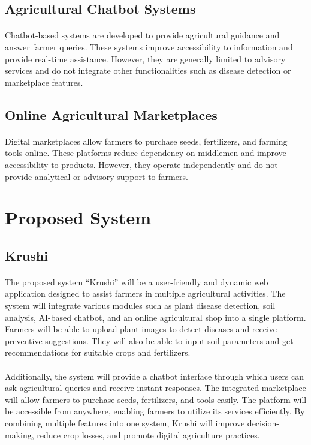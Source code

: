 \subsection{Agricultural Chatbot Systems}
\paragraph{}Chatbot-based systems are developed to provide agricultural guidance and answer farmer queries. These systems improve accessibility to information and provide real-time assistance. However, they are generally limited to advisory services and do not integrate other functionalities such as disease detection or marketplace features.

\subsection{Online Agricultural Marketplaces}
\paragraph{}Digital marketplaces allow farmers to purchase seeds, fertilizers, and farming tools online. These platforms reduce dependency on middlemen and improve accessibility to products. However, they operate independently and do not provide analytical or advisory support to farmers.

\newpage

\section{Proposed System}

\subsection{Krushi}
\paragraph{}The proposed system “Krushi” will be a user-friendly and dynamic web application designed to assist farmers in multiple agricultural activities. The system will integrate various modules such as plant disease detection, soil analysis, AI-based chatbot, and an online agricultural shop into a single platform. Farmers will be able to upload plant images to detect diseases and receive preventive suggestions. They will also be able to input soil parameters and get recommendations for suitable crops and fertilizers.

\paragraph{}Additionally, the system will provide a chatbot interface through which users can ask agricultural queries and receive instant responses. The integrated marketplace will allow farmers to purchase seeds, fertilizers, and tools easily. The platform will be accessible from anywhere, enabling farmers to utilize its services efficiently. By combining multiple features into one system, Krushi will improve decision-making, reduce crop losses, and promote digital agriculture practices.